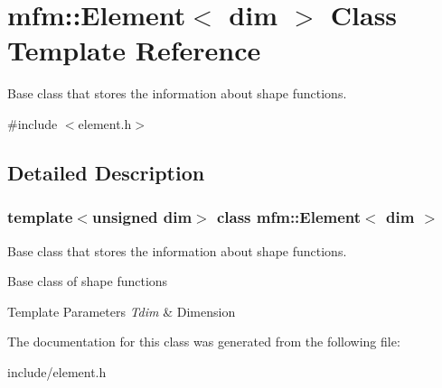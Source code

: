 \hypertarget{classmfm_1_1_element}{}\section{mfm\+:\+:Element$<$ dim $>$ Class Template Reference}
\label{classmfm_1_1_element}


Base class that stores the information about shape functions.  




{\ttfamily \#include $<$element.\+h$>$}



\subsection{Detailed Description}
\subsubsection*{template$<$unsigned dim$>$\newline
class mfm\+::\+Element$<$ dim $>$}

Base class that stores the information about shape functions. 

Base class of shape functions 
\begin{DoxyTemplParams}{Template Parameters}
{\em Tdim} & Dimension \\
\hline
\end{DoxyTemplParams}


The documentation for this class was generated from the following file\+:\begin{DoxyCompactItemize}
\item 
include/element.\+h\end{DoxyCompactItemize}
